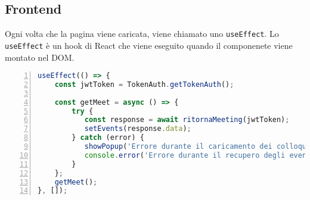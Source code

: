 \subsection{Frontend}
Ogni volta che la pagina viene caricata, viene chiamato uno \texttt{useEffect}.
Lo \texttt{useEffect} è un hook di React che viene eseguito quando il componenete viene montato nel DOM. \cite{reactUseEffect}
\begin{lstlisting}[language=typescript, frame=lines, basicstyle=\ttfamily\scriptsize, numbers=left]
useEffect(() => {
    const jwtToken = TokenAuth.getTokenAuth();
    
    const getMeet = async () => {
        try {
           const response = await ritornaMeeting(jwtToken);
           setEvents(response.data);
        } catch (error) {
           showPopup('Errore durante il caricamento dei colloqui', false);
           console.error('Errore durante il recupero degli eventi:', error);
        }
    };  
    getMeet();
}, []);
\end{lstlisting}

